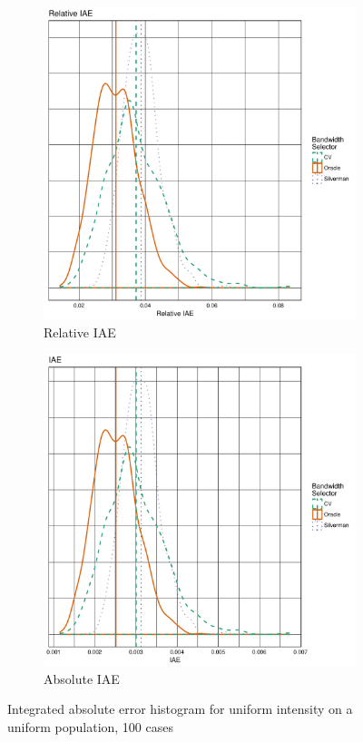 \begin{figure}[htbp]
    \centering
    \begin{subfigure}[b]{0.45\textwidth}
    \includegraphics[width=\textwidth]{output/iae-relative-histogram}
    \caption{Relative IAE}
    \end{subfigure}
    \begin{subfigure}[b]{0.45\textwidth}
    \includegraphics[width=\textwidth]{output/iae-histogram}
    \caption{Absolute IAE}
    \end{subfigure}
    \caption[IAE: uniform on uniform]{Integrated absolute error histogram for uniform intensity on a uniform population, 100 cases}
    \label{fig:iae:template}
\end{figure}

